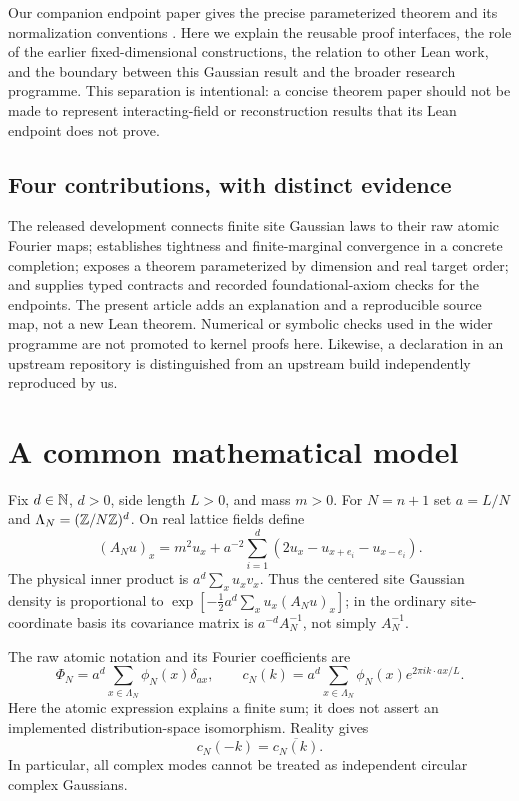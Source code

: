 \documentclass[11pt]{amsart}
\theoremstyle{remark}\newtheorem{remark}[theorem]{Remark}
\begin{document}
Our companion endpoint paper gives the precise parameterized theorem and its normalization conventions \cite{Endpoint}. Here we explain the reusable proof interfaces, the role of the earlier fixed-dimensional constructions, the relation to other Lean work, and the boundary between this Gaussian result and the broader research programme. This separation is intentional: a concise theorem paper should not be made to represent interacting-field or reconstruction results that its Lean endpoint does not prove.

\subsection{Four contributions, with distinct evidence}
The released development connects finite site Gaussian laws to their raw atomic Fourier maps; establishes tightness and finite-marginal convergence in a concrete completion; exposes a theorem parameterized by dimension and real target order; and supplies typed contracts and recorded foundational-axiom checks for the endpoints. The present article adds an explanation and a reproducible source map, not a new Lean theorem. Numerical or symbolic checks used in the wider programme are not promoted to kernel proofs here. Likewise, a declaration in an upstream repository is distinguished from an upstream build independently reproduced by us.

\section{A common mathematical model}
Fix $d\in\mathbb N$, $d>0$, side length $L>0$, and mass $m>0$. For $N=n+1$ set $a=L/N$ and $\Lambda_N=(\mathbb Z/N\mathbb Z)^d$. On real lattice fields define
\begin{equation}\label{eq:operator}
 (A_Nu)_x=m^2u_x+a^{-2}\sum_{i=1}^d(2u_x-u_{x+e_i}-u_{x-e_i}).
\end{equation}
The physical inner product is $a^d\sum_xu_xv_x$. Thus the centered site Gaussian density is proportional to
$\exp[-\tfrac12 a^d\sum_xu_x(A_Nu)_x]$; in the ordinary site-coordinate basis its covariance matrix is $a^{-d}A_N^{-1}$, not simply $A_N^{-1}$.

The raw atomic notation and its Fourier coefficients are
\begin{equation}\label{eq:atomic}
 \Phi_N=a^d\sum_{x\in\Lambda_N}\phi_N(x)\delta_{ax},\qquad
 c_N(k)=a^d\sum_{x\in\Lambda_N}\phi_N(x)e^{2\pi i k\cdot ax/L}.
\end{equation}
Here the atomic expression explains a finite sum; it does not assert an implemented distribution-space isomorphism. Reality gives
\begin{equation}\label{eq:conjugacy}
 c_N(-k)=\overline{c_N(k)}.
\end{equation}
In particular, all complex modes cannot be treated as independent circular complex Gaussians.
\end{document}

